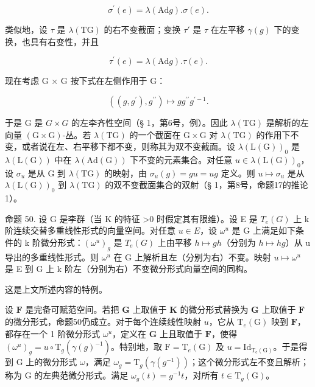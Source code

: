 \[
\sigma^ {\prime} (e) = \lambda (\mathrm{Ad} g). \sigma (e).\tag{26}
\]

类似地，设 \(\tau\) 是 \(\lambda(\mathrm{TG})\) 的右不变截面；变换 \(\tau'\) 是 \(\tau\) 在左平移 \(\gamma(g)\) 下的变换，也具有右变性，并且

\[
\tau^ {\prime} (e) = \lambda (\mathrm{Ad} g). \tau (e).\tag{27}
\]

现在考虑 G × G 按下式在左侧作用于 G：

\[
\left(\left(g, g ^ {\prime}\right), g ^ {\prime \prime}\right) \mapsto g g ^ {\prime \prime} g ^ {\prime - 1}.
\]

于是 G 是 \(G \times G\) 的左李齐性空间（§ 1，第6号，例）。因此 \(\lambda(\mathrm{TG})\) 是解析的左向量 \((\mathrm{G} \times \mathrm{G})\)-丛。若 \(\lambda(\mathrm{TG})\) 的一个截面在 \(\mathrm{G} \times \mathrm{G}\) 对 \(\lambda(\mathrm{TG})\) 的作用下不变，或者说在左、右平移下都不变，则称其为双不变截面。设 \(\lambda(\mathrm{L}(\mathrm{G}))_{0}\) 是 \(\lambda(\mathrm{L}(\mathrm{G}))\) 中在 \(\lambda(\mathrm{Ad}(\mathrm{G}))\) 下不变的元素集合。对任意 \(u \in \lambda(\mathrm{L}(\mathrm{G}))_{0}\)，设 \(\sigma_{u}\) 是从 G 到 \(\lambda(\mathrm{TG})\) 的映射，由 \(\sigma_{u}(g) = gu = ug\) 定义。则 \(u \mapsto \sigma_{u}\) 是从 \(\lambda(\mathrm{L}(\mathrm{G}))_{0}\) 到 \(\lambda(\mathrm{TG})\) 的双不变截面集合的双射（§ 1，第8号，命题17的推论1）。

命题 50. 设 G 是李群（当 K 的特征 \textgreater0 时假定其有限维）。设 E 是 \(T_{e}(G)\) 上 k 阶连续交替多重线性形式的向量空间。对任意 \(u \in E\)，设 \(\omega^{u}\) 是 G 上满足如下条件的 k 阶微分形式：\((\omega^{u})_{g}\) 是 \(T_{e}(G)\) 上由平移 \(h \mapsto gh\)（分别为 \(h \mapsto hg\)）从 u 导出的多重线性形式。则 \(\omega^{u}\) 在 G 上解析且左（分别为右）不变。映射 \(u \mapsto \omega^{u}\) 是 E 到 G 上 k 阶左（分别为右）不变微分形式向量空间的同构。

这是上文所述内容的特例。

设 \(\mathbf{F}\) 是完备可赋范空间。若把 \(\mathbf{G}\) 上取值于 \(\mathbf{K}\) 的微分形式替换为 \(\mathbf{G}\) 上取值于 \(\mathbf{F}\) 的微分形式，命题50仍成立。对于每个连续线性映射 \(u\)，它从 \(\mathrm{T}_e(\mathrm{G})\) 映到 \(\mathbf{F}\)，都存在一个 1 阶微分形式 \(\omega^u\)，定义在 \(\mathbf{G}\) 上且取值于 \(\mathbf{F}\)，使得 \((\omega^{u})_{g} = u \circ \mathrm{T}_{g}(\gamma(g)^{-1})\)。特别地，取 \(\mathrm{F} = \mathrm{T}_e(\mathrm{G})\) 及 \(u = \mathrm{Id}_{\mathrm{T_e(G)}}\)。于是得到 G 上的微分形式 \(\omega\)，满足 \(\omega_{g} = \mathrm{T}_{g}(\gamma (g^{-1}))\)；这个微分形式左不变且解析；称为 G 的左典范微分形式。满足 \(\omega_{g}(t) = g^{-1}t\)，对所有 \(t\in \mathrm{T}_g(\mathrm{G})\)。

